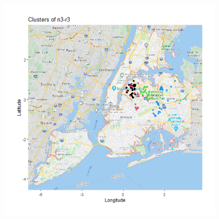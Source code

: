 \documentclass{FR16}
\begin{document}
\begin{figure}[!htb]
\begin{minipage}{0.33\textwidth}
   \end{minipage}
   \begin{minipage}{0.33\textwidth}
     \centering
     \includegraphics[width=1\linewidth]{figures/clust-n3-r3.png} 
   \end{minipage}\hfill 
\end{figure}

\newpage
\end{document}
